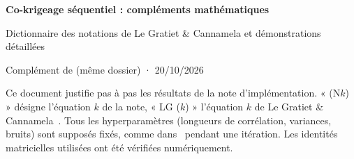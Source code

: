 \documentclass[10pt,a4paper]{article}
\begin{document}
{\centering
{\Large\bfseries\color{blue!40!black} Co-krigeage séquentiel : compléments mathématiques\par}
\vspace{0.2em}
{\large Dictionnaire des notations de Le Gratiet \& Cannamela et démonstrations détaillées\par}
\vspace{0.3em}
{\small Complément de  (même dossier) · 20/10/2026\par}
\vspace{0.2em}}

Ce document justifie pas à pas les résultats de la note d'implémentation. « (N$k$) » désigne l'équation $k$
de la note, « LG ($k$) » l'équation $k$ de Le Gratiet \& Cannamela~\cite{LGC15}. Tous les hyperparamètres
(longueurs de corrélation, variances, bruits) sont supposés fixés, comme dans~\cite{LGC15} pendant une
itération. Les identités matricielles utilisées ont été vérifiées numériquement.

\end{document}
